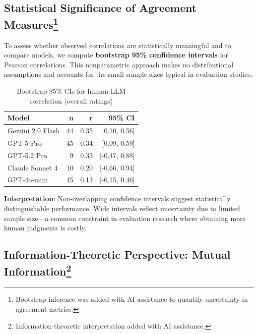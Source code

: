 \documentclass[
  11pt,
  letterpaper,
  DIV=11,
  numbers=noendperiod]{scrreprt}
\begin{document}
\subsection[Statistical Significance of Agreement
Measures]{\texorpdfstring{Statistical Significance of Agreement
Measures\footnote{Bootstrap inference was added with AI assistance to
  quantify uncertainty in agreement metrics.}}{Statistical Significance of Agreement Measures}}\label{statistical-significance-of-agreement-measuresresults_ratings-4}

To assess whether observed correlations are statistically meaningful and
to compare models, we compute \textbf{bootstrap 95\% confidence
intervals} for Pearson correlations. This nonparametric approach makes
no distributional assumptions and accounts for the small sample sizes
typical in evaluation studies.

\begin{longtable}[]{@{}lrrr@{}}

\caption{\label{tbl-bootstrap-ci}Bootstrap 95\% CIs for human-LLM
correlation (overall ratings)}

\tabularnewline

\toprule\noalign{}
Model & n & r & 95\% CI \\
\midrule\noalign{}
\endhead
\bottomrule\noalign{}
\endlastfoot
Gemini 2.0 Flash & 44 & 0.35 & {[}0.10, 0.56{]} \\
GPT-5 Pro & 45 & 0.34 & {[}0.09, 0.59{]} \\
GPT-5.2 Pro & 9 & 0.33 & {[}-0.47, 0.88{]} \\
Claude Sonnet 4 & 10 & 0.20 & {[}-0.66, 0.94{]} \\
GPT-4o-mini & 45 & 0.13 & {[}-0.15, 0.46{]} \\

\end{longtable}

\textbf{Interpretation}: Non-overlapping confidence intervals suggest
statistically distinguishable performance. Wide intervals reflect
uncertainty due to limited sample size---a common constraint in
evaluation research where obtaining more human judgments is costly.

\subsection[Information-Theoretic Perspective: Mutual
Information]{\texorpdfstring{Information-Theoretic Perspective: Mutual
Information\footnote{Information-theoretic interpretation added with AI
  assistance.}}{Information-Theoretic Perspective: Mutual Information}}\label{information-theoretic-perspective-mutual-informationresults_ratings-5}
\end{document}
